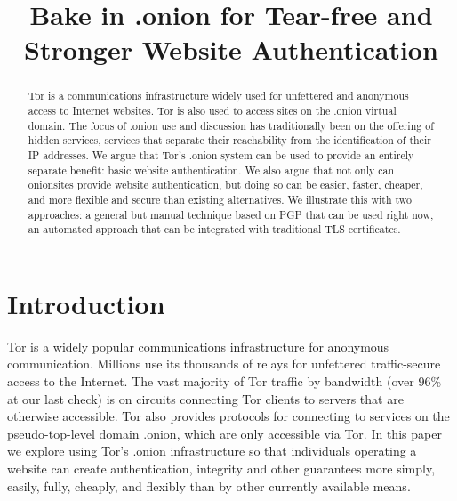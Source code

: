 \documentclass[10pt, conference, compsocconf]{styles/IEEEtran}
\title{Bake in .onion for Tear-free and Stronger Website Authentication}
\author{
\IEEEauthorblockN{Paul Syverson}
\IEEEauthorblockA{U.S. Naval Research Laboratory\\
paul.syverson@nrl.navy.mil}
\and
\IEEEauthorblockN{Griffin Boyce}
\IEEEauthorblockA{Berkman Center for Internet and Society at Harvard University\\
griffin@cryptolab.net}
}
\begin{document}
\maketitle

\begin{abstract}
  Tor is a communications infrastructure widely used for unfettered
  and anonymous access to Internet websites. Tor is also used to
  access sites on the .onion virtual domain.  The focus of .onion use
  and discussion has traditionally been on the offering of hidden
  services, services that separate their reachability from the
  identification of their IP addresses. We argue that Tor's .onion
  system can be used to provide an entirely separate benefit: basic
  website authentication. We also argue that not only can onionsites
  provide website authentication, but doing so can be easier, faster,
  cheaper, and more flexible and secure than existing alternatives.
  We illustrate this with two approaches: a general but manual
  technique based on PGP that can be used right now, an automated
  approach that can be integrated with traditional TLS certificates.
\end{abstract}

% 
% 
% 
% 
% 
% 
% 
% 
% 
% 
% 

\section{Introduction}
Tor is a widely popular communications infrastructure for anonymous
communication. Millions use its thousands of relays for unfettered
traffic-secure access to the Internet. The vast majority of Tor
traffic by bandwidth (over 96\% at our last check) is on circuits
connecting Tor clients to servers that are otherwise accessible.  Tor
also provides protocols for connecting to services on the
pseudo-top-level domain .onion, which are only accessible via Tor.
In this paper we explore using Tor's .onion infrastructure so that
individuals operating a website can create authentication, integrity
and other guarantees more simply, easily, fully, cheaply, and flexibly
than by other currently available means.
\end{document}
